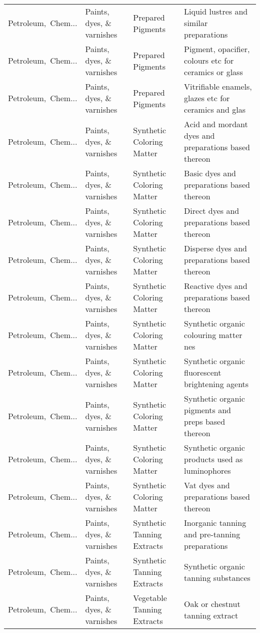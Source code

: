 \begin{appendices}
\begin{xltabular}{\textwidth}{|p{0.10\textwidth}|p{0.25\textwidth}|p{0.24\textwidth}|p{0.31\textwidth}|}
Petroleum,\ Chem... & Paints, dyes, \& varnishes & Prepared Pigments & Liquid lustres and similar preparations \\
Petroleum,\ Chem... & Paints, dyes, \& varnishes & Prepared Pigments & Pigment, opacifier, colours etc for ceramics or glass \\
Petroleum,\ Chem... & Paints, dyes, \& varnishes & Prepared Pigments & Vitrifiable enamels, glazes etc for ceramics and glas \\
Petroleum,\ Chem... & Paints, dyes, \& varnishes & Synthetic Coloring Matter & Acid and mordant dyes and preparations based thereon \\
Petroleum,\ Chem... & Paints, dyes, \& varnishes & Synthetic Coloring Matter & Basic dyes and preparations based thereon \\
Petroleum,\ Chem... & Paints, dyes, \& varnishes & Synthetic Coloring Matter & Direct dyes and preparations based thereon \\
Petroleum,\ Chem... & Paints, dyes, \& varnishes & Synthetic Coloring Matter & Disperse dyes and preparations based thereon \\
Petroleum,\ Chem... & Paints, dyes, \& varnishes & Synthetic Coloring Matter & Reactive dyes and preparations based thereon \\
Petroleum,\ Chem... & Paints, dyes, \& varnishes & Synthetic Coloring Matter & Synthetic organic colouring matter nes \\
Petroleum,\ Chem... & Paints, dyes, \& varnishes & Synthetic Coloring Matter & Synthetic organic fluorescent brightening agents \\
Petroleum,\ Chem... & Paints, dyes, \& varnishes & Synthetic Coloring Matter & Synthetic organic pigments and preps based thereon \\
Petroleum,\ Chem... & Paints, dyes, \& varnishes & Synthetic Coloring Matter & Synthetic organic products used as luminophores \\
Petroleum,\ Chem... & Paints, dyes, \& varnishes & Synthetic Coloring Matter & Vat dyes and preparations based thereon \\
Petroleum,\ Chem... & Paints, dyes, \& varnishes & Synthetic Tanning Extracts & Inorganic tanning and pre-tanning preparations \\
Petroleum,\ Chem... & Paints, dyes, \& varnishes & Synthetic Tanning Extracts & Synthetic organic tanning substances \\
Petroleum,\ Chem... & Paints, dyes, \& varnishes & Vegetable Tanning Extracts & Oak or chestnut tanning extract \\

\end{xltabular}
\end{appendices}
